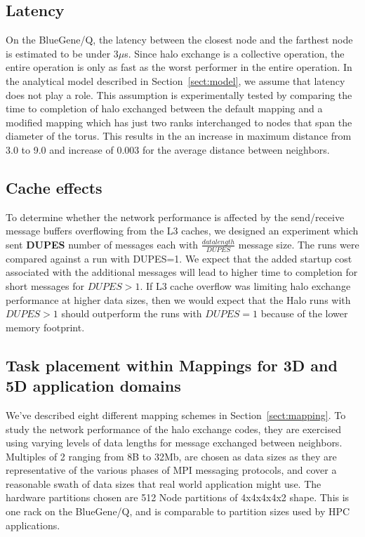 \documentclass{acm_proc_article-sp}
\begin{document}
\subsection{Latency}
On the BlueGene/Q, the latency between the closest node and the farthest node is estimated to be under 3$\mu$s\cite{BGQ_Interconnect_2012}.
Since halo exchange is a collective operation, the entire operation is only as fast as the worst performer in the entire operation.
In the analytical model described in Section~\ref{sect:model}, we assume that latency does not play a role.
This assumption is experimentally tested by comparing the time to completion of halo exchanged between the default mapping and a modified
mapping which has just two ranks interchanged to nodes that span the diameter of the torus. This results in the an increase in maximum distance
from 3.0 to 9.0 and increase of 0.003 for the average distance between neighbors.

\subsection{Cache effects}
To determine whether the network performance is affected by the send/receive message buffers overflowing from the
L3 caches, we designed an experiment which sent \textbf{DUPES} number of messages each with $\frac{datalength}{DUPES}$
message size. The runs were compared against a run with DUPES=1. 
We expect that the added startup cost associated with the
additional messages will lead to higher time to completion for short messages for
$DUPES>1$.
If L3 cache overflow was limiting halo exchange performance at higher data
sizes, then we would expect that the Halo runs with $DUPES>1$ should outperform
the runs with $DUPES=1$ because of the lower memory footprint.

\subsection{Task placement within Mappings for 3D and 5D application domains}
We've described eight different mapping schemes in Section~\ref{sect:mapping}.
To study the network performance of the halo exchange codes, they are exercised using varying levels of data lengths for message exchanged between neighbors.
Multiples of 2 ranging from 8B to 32Mb,  are chosen as data sizes as they are representative of the various phases of MPI messaging protocols, and cover
a reasonable swath of data sizes that real world application might use. The hardware partitions chosen are 512 Node partitions of 4x4x4x4x2 shape. This
is one rack on the BlueGene/Q, and is comparable to partition sizes used by HPC applications.
\end{document}

